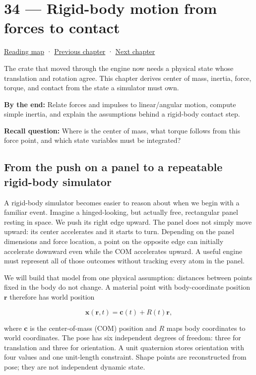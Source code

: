 \hypertarget{06-engine-ii-ch034}{}
\chapter{34 --- Rigid-body motion from forces to contact}\label{06-engine-ii-ch034-rigid-body-motion-from-forces-to-contact}

\hyperref[volume-reading-map]{Reading map} · \hyperref[06-engine-ii-ch033]{Previous chapter} · \hyperref[06-engine-ii-ch035]{Next chapter}

The crate that moved through the engine now needs a physical state whose translation and rotation agree. This chapter derives center of mass, inertia, force, torque, and contact from the state a simulator must own.

\textbf{By the end:} Relate forces and impulses to linear/angular motion, compute simple inertia, and explain the assumptions behind a rigid-body contact step.

\textbf{Recall question:} Where is the center of mass, what torque follows from this force point, and which state variables must be integrated?

\section{From the push on a panel to a repeatable rigid-body simulator}\label{06-engine-ii-ch034-from-the-push-on-a-panel-to-a-repeatable-rigid-body-simulator}

A rigid-body simulator becomes easier to reason about when we begin with a familiar event. Imagine a hinged-looking, but actually free, rectangular panel resting in space. We push its right edge upward. The panel does not simply move upward: its center accelerates and it starts to turn. Depending on the panel dimensions and force location, a point on the opposite edge can initially accelerate downward even while the COM accelerates upward. A useful engine must represent all of those outcomes without tracking every atom in the panel.

We will build that model from one physical assumption: distances between points fixed in the body do not change. A material point with body-coordinate position \(\mathbf r\) therefore has world position

\[
\mathbf x(\mathbf r,t)=\mathbf c(t)+R(t)\mathbf r,
\]

where \(\mathbf c\) is the center-of-mass (COM) position and \(R\) maps body coordinates to world coordinates. The pose has six independent degrees of freedom: three for translation and three for orientation. A unit quaternion stores orientation with four values and one unit-length constraint. Shape points are reconstructed from pose; they are not independent dynamic state.

